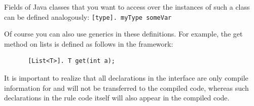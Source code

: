 Fields of Java classes that you want to access over the instances of such a class can be defined analogously: \texttt{[type]. myType someVar}

Of course you can also use generics in these definitions. For example, the get method on lists is defined as follows in the \vonda framework:

\begin{figure}[htbp]
\centering
\small
\begin{lstlisting}
 [List<T>]. T get(int a);
\end{lstlisting}
\end{figure}
%


It is important to realize that all declarations in the interface are only compile information for \vonda and will not be transferred to the compiled code, whereas such declarations in the rule code itself will also appear in the compiled code.



